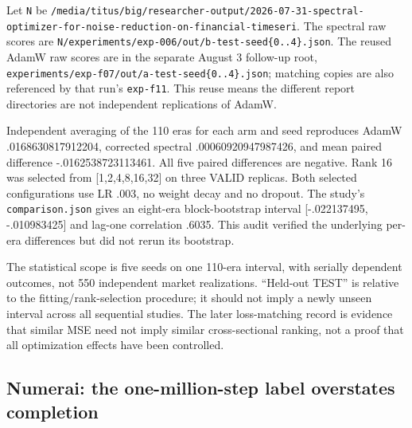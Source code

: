 \documentclass[
  british,
  10pt,
  a4paper,
]{article}
\begin{document}
Let \texttt{N} be
\texttt{/\allowbreak{}media/\allowbreak{}titus/\allowbreak{}big/\allowbreak{}researcher-\allowbreak{}output/\allowbreak{}2026-\allowbreak{}07-\allowbreak{}31-\allowbreak{}spectral-\allowbreak{}optimizer-\allowbreak{}for-\allowbreak{}noise-\allowbreak{}reduction-\allowbreak{}on-\allowbreak{}financial-\allowbreak{}timeseri}.
The spectral raw scores are
\texttt{N/\allowbreak{}experiments/\allowbreak{}exp-\allowbreak{}006/\allowbreak{}out/\allowbreak{}b-\allowbreak{}test-\allowbreak{}seed\{\allowbreak{}0.\allowbreak{}.\allowbreak{}4\}\allowbreak{}.\allowbreak{}json}.
The reused AdamW raw scores are in the separate August 3 follow-up root,
\texttt{experiments/\allowbreak{}exp-\allowbreak{}f07/\allowbreak{}out/\allowbreak{}a-\allowbreak{}test-\allowbreak{}seed\{\allowbreak{}0.\allowbreak{}.\allowbreak{}4\}\allowbreak{}.\allowbreak{}json};
matching copies are also referenced by that run's \texttt{exp-f11}. This
reuse means the different report directories are not independent
replications of AdamW.

Independent averaging of the 110 eras for each arm and seed reproduces
AdamW .\allowbreak{}016863081791\allowbreak{}2204,\allowbreak{}
corrected spectral
.\allowbreak{}000609209479\allowbreak{}87426,\allowbreak{} and mean
paired difference
-\allowbreak{}.\allowbreak{}016253872311\allowbreak{}3461.\allowbreak{}
All five paired differences are negative. Rank 16 was selected from
[1,\allowbreak{}2,\allowbreak{}4,\allowbreak{}8,\allowbreak{}16,\allowbreak{}32]
on three VALID replicas. Both selected configurations use LR .003, no
weight decay and no dropout. The study's
\texttt{comparison.\allowbreak{}json} gives an eight-era
block-\allowbreak{}bootstrap interval
[-\allowbreak{}.\allowbreak{}022137495,\allowbreak{}
-\allowbreak{}.\allowbreak{}010983425] and lag-one correlation .6035.
This audit verified the underlying per-era differences but did not rerun
its bootstrap.

The statistical scope is five seeds on one 110-era interval, with
serially dependent outcomes, not 550 independent market
realizations\allowbreak{}.\allowbreak{} ``Held-out TEST'' is relative to
the fitting/\allowbreak{}rank-\allowbreak{}selection procedure; it
should not imply a newly unseen interval across all sequential studies.
The later loss-\allowbreak{}matching record is evidence that similar MSE
need not imply similar cross-\allowbreak{}sectional ranking, not a proof
that all optimization effects have been controlled.\allowbreak{}

\subsection{\texorpdfstring{Numerai: the
one-\allowbreak{}million-\allowbreak{}step label overstates
completion}{Numerai: the  label overstates completion}}\label{external-results-audit--numerai-the-one-million-step-label-overstates-completion}
\end{document}
